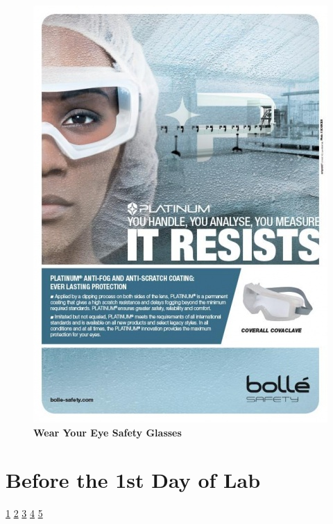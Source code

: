 \documentclass{../lab}
\begin{document}
\begin{figure}[H]
  \href{http://experimentationlab.berkeley.edu/sites/default/files/upimages/4_eye-wear-face.jpg}{\includegraphics[width=\linewidth,keepaspectratio]{images/5_eye-wear-face.jpg}}
  \centering
  \textbf{Wear Your Eye Safety Glasses}
  \label{fig:HotPlate-JOS_3505-Lg.jpg}
\endminipage
\end{figure}

\section{Before the 1st Day of Lab}

\signatures \hyperlink{Low-Frequency Oscillator}{1} \hyperlink{Steps}{2} \hyperlink{DC Effect}{3} \hyperlink{AC Effect}{4} \hyperlink{RF Frequency}{5}
\end{document}

